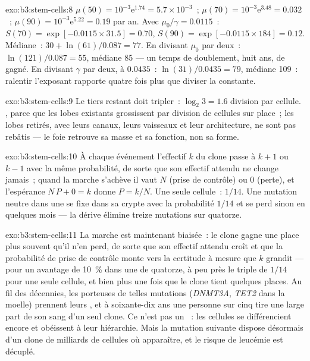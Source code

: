 \begin{solution}{exo:b3:stem-cells:8}
$\mu(50) = 10^{-3}\mathrm{e}^{1.74} = 5.7\times 10^{-3}$~; $\mu(70) =
10^{-3}\mathrm{e}^{3.48} = 0.032$~; $\mu(90) = 10^{-3}\mathrm{e}^{5.22} =
0.19$ par an. Avec $\mu_{0}/\gamma = 0.0115$~: $S(70) = \exp[-0.0115
\times 31.5] = 0.70$, $S(90) = \exp[-0.0115\times 184] = 0.12$. Médiane~:
$30 + \ln(61)/0.087 = 77$. En divisant $\mu_{0}$ par deux~:
$\ln(121)/0.087 = 55$, médiane 85 --- un temps de doublement, huit ans,
de gagné. En divisant $\gamma$ par deux, à $0.0435$~: $\ln(31)/0.0435 = 79$,
médiane 109~: ralentir l'exposant rapporte quatre fois plus que diviser
la constante.
\end{solution}

\begin{solution}{exo:b3:stem-cells:9}
Le tiers restant doit tripler~: $\log_{2}3 = 1.6$ division par cellule.
, parce que les lobes existants grossissent par
division de cellules sur place~; les lobes retirés, avec leurs canaux,
leurs vaisseaux et leur architecture, ne sont pas rebâtis --- le foie
retrouve sa masse et sa fonction, non sa forme.
\end{solution}

\begin{solution}{exo:b3:stem-cells:10}
À chaque événement l'effectif $k$ du clone passe à $k + 1$ ou $k - 1$
avec la même probabilité, de sorte que son effectif attendu ne change
jamais~; quand la marche s'achève il vaut $N$ (prise de contrôle) ou $0$
(perte), et l'espérance $N\,P + 0 = k$ donne $P = k/N$. Une seule
cellule~: $1/14$. Une mutation neutre dans une  se fixe
dans sa crypte avec la probabilité $1/14$ et se perd sinon en quelques
mois --- la dérive élimine treize mutations sur quatorze.
\end{solution}

\begin{solution}{exo:b3:stem-cells:11}
La marche est maintenant biaisée~: le clone gagne une place plus souvent
qu'il n'en perd, de sorte que son effectif attendu croît et que la
probabilité de prise de contrôle monte vers la certitude à mesure que
$k$ grandit --- pour un avantage de \qty{10}{\%} dans une  de
quatorze, à peu près le triple de $1/14$ pour une seule cellule, et bien
plus une fois que le clone tient quelques places. Au fil des décennies,
les  porteuses de telles mutations (\emph{DNMT3A},
\emph{TET2} dans la moelle) prennent leurs , et à soixante-dix ans
une personne sur cinq tire une large part de son sang d'un seul clone.
Ce n'est pas un ~: les cellules se différencient encore et
obéissent à leur hiérarchie. Mais la mutation suivante dispose désormais
d'un clone de milliards de cellules où apparaître, et le risque de
leucémie est décuplé.
\end{solution}

